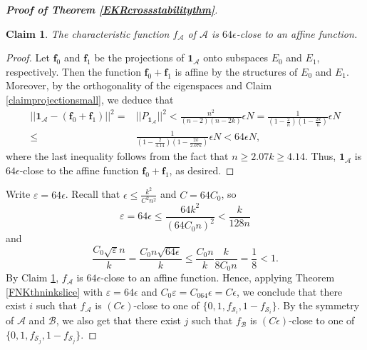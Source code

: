 \documentclass[10pt,a4paper]{amsart}
\numberwithin{equation}{section}
\newtheorem{claim}[theorem]{Claim}
\def\A{\mathcal{A}}
\def\B{\mathcal{B}}
\def\S{\mathcal{S}}
\def\f{\mathbf{f}}
\def\1{\mathbf{1}}
\begin{document}
\begin{proof}[{\bf Proof of Theorem \ref{EKRcrossstabilitythm}}]
\begin{claim}\label{claimcloseaffine}
The characteristic function $f_\A$ of $\A$ is $64\epsilon$-close to an affine function.
\end{claim}
\begin{proof}
Let $\f_0$ and $\f_1$ be the projections of $\1_\A$ onto subspaces $E_0$ and
$E_1$, respectively.
Then the function $\f_0+\f_1$ is affine by the structures of $E_0$ and
$E_1$.
Moreover, by the orthogonality of the eigenspaces and Claim \ref{claimprojectionsmall},
we deduce that
\begin{align*}
||\1_\A-(\f_0+\f_1)||^2=&||P_{\1_\A}||^2
< \frac{n^2}{ (n-2 )(n-2k )}\epsilon N
=\frac{1}{ \left(1-\frac{2}{n} \right)\left(1-\frac{2k}{n}\right)}\epsilon N\\
\leq&\frac{1}{\left(1-\frac{2}{4.14} \right) \left(1-\frac{2k}{2.07k}\right)}\epsilon N
<64\epsilon N ,
\end{align*}
%
where the last inequality follows from the fact that $n\geq 2.07k\geq 4.14.$
Thus, $\1_\A$ is $64\epsilon$-close to the affine function $\f_0+\f_1$,
as desired.
\end{proof}


Write $\varepsilon=64\epsilon$. %
Recall that $\epsilon\leq \frac{k^2}{C^2n^2}$ and $C=64C_0$, so
$$\varepsilon=64\epsilon \leq \frac{64k^2}{(64C_0 n)^2}  < \frac{k}{128n}$$
and
$$\frac{C_0 \sqrt{\varepsilon}n}{k}=
\frac{C_0n\sqrt{64\epsilon}}{k}
\leq\frac{C_0n }{k}\frac{k }{8C_0n}=\frac18<1.$$
By Claim \ref{claimcloseaffine}, $f_\A$ is $64\epsilon$-close to an affine function.
Hence, applying Theorem \ref{FNKthninkslice} with $\varepsilon=64\epsilon$ and
$C_0\varepsilon=C_064\epsilon=C\epsilon$,
we conclude that there exist $i$
such that $f_\A$ is $(C\epsilon)$-close to one of $\{0,1, f_{\S_i},1-f_{\S_i}\}$.
By the symmetry of $\A$ and $\B$, we also get that there exist $j$ such that $f_\B$ is $(C\epsilon)$-close to one of $\{0,1, f_{\S_j},1-f_{\S_j}\}$.


\end{proof}
\end{document}
